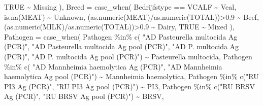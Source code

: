 \documentclass[
]{article}
\newenvironment{Shaded}{\begin{snugshade}}{\end{snugshade}}
\newcommand{\AttributeTok}[1]{\textcolor[rgb]{0.77,0.63,0.00}{#1}}
\newcommand{\ConstantTok}[1]{\textcolor[rgb]{0.00,0.00,0.00}{#1}}
\newcommand{\FloatTok}[1]{\textcolor[rgb]{0.00,0.00,0.81}{#1}}
\newcommand{\FunctionTok}[1]{\textcolor[rgb]{0.00,0.00,0.00}{#1}}
\newcommand{\NormalTok}[1]{#1}
\newcommand{\SpecialCharTok}[1]{\textcolor[rgb]{0.00,0.00,0.00}{#1}}
\newcommand{\StringTok}[1]{\textcolor[rgb]{0.31,0.60,0.02}{#1}}
\begin{document}
\begin{Shaded}
\begin{Highlighting}[]
      \ConstantTok{TRUE} \SpecialCharTok{\textasciitilde{}} \StringTok{\textquotesingle{}Missing\textquotesingle{}}
\NormalTok{    ),}
    \AttributeTok{Breed =} \FunctionTok{case\_when}\NormalTok{(}
\NormalTok{      Bedrijfstype }\SpecialCharTok{==} \StringTok{\textquotesingle{}VCALF\textquotesingle{}} \SpecialCharTok{\textasciitilde{}} \StringTok{\textquotesingle{}Veal\textquotesingle{}}\NormalTok{,}
      \FunctionTok{is.na}\NormalTok{(MEAT) }\SpecialCharTok{\textasciitilde{}} \StringTok{\textquotesingle{}Unknown\textquotesingle{}}\NormalTok{,}
\NormalTok{      (}\FunctionTok{as.numeric}\NormalTok{(MEAT)}\SpecialCharTok{/}\FunctionTok{as.numeric}\NormalTok{(TOTAL))}\SpecialCharTok{\textgreater{}}\FloatTok{0.9} \SpecialCharTok{\textasciitilde{}} \StringTok{\textquotesingle{}Beef\textquotesingle{}}\NormalTok{, }
\NormalTok{      (}\FunctionTok{as.numeric}\NormalTok{(MILK)}\SpecialCharTok{/}\FunctionTok{as.numeric}\NormalTok{(TOTAL))}\SpecialCharTok{\textgreater{}}\FloatTok{0.9} \SpecialCharTok{\textasciitilde{}} \StringTok{\textquotesingle{}Dairy\textquotesingle{}}\NormalTok{,}
      \ConstantTok{TRUE} \SpecialCharTok{\textasciitilde{}} \StringTok{\textquotesingle{}Mixed\textquotesingle{}} 
\NormalTok{    ),}
    \AttributeTok{Pathogen =} \FunctionTok{case\_when}\NormalTok{(}
\NormalTok{      Pathogen }\SpecialCharTok{\%in\%} \FunctionTok{c}\NormalTok{(}
        \StringTok{"AD Pasteurella multocida Ag (PCR)"}\NormalTok{, }
        \StringTok{"AD Pasteurella multocida Ag pool (PCR)"}\NormalTok{, }
        \StringTok{"AD P. multocida Ag (PCR)"}\NormalTok{, }
        \StringTok{"AD P. multocida Ag pool (PCR)"}\NormalTok{) }\SpecialCharTok{\textasciitilde{}} \StringTok{\textquotesingle{}Pasteurella multocida\textquotesingle{}}\NormalTok{,}
\NormalTok{      Pathogen }\SpecialCharTok{\%in\%} \FunctionTok{c}\NormalTok{(}
        \StringTok{"AD Mannheimia haemolytica Ag (PCR)"}\NormalTok{, }
        \StringTok{"AD Mannheimia haemolytica Ag pool (PCR)"}\NormalTok{) }\SpecialCharTok{\textasciitilde{}} \StringTok{\textquotesingle{}Mannheimia haemolytica\textquotesingle{}}\NormalTok{,}
\NormalTok{      Pathogen }\SpecialCharTok{\%in\%} \FunctionTok{c}\NormalTok{(}\StringTok{"RU PI3 Ag (PCR)"}\NormalTok{, }\StringTok{"RU PI3 Ag pool (PCR)"}\NormalTok{) }\SpecialCharTok{\textasciitilde{}} \StringTok{\textquotesingle{}PI3\textquotesingle{}}\NormalTok{,}
\NormalTok{      Pathogen }\SpecialCharTok{\%in\%} \FunctionTok{c}\NormalTok{(}\StringTok{"RU BRSV Ag (PCR)"}\NormalTok{, }\StringTok{"RU BRSV Ag pool (PCR)"}\NormalTok{) }\SpecialCharTok{\textasciitilde{}} \StringTok{\textquotesingle{}BRSV\textquotesingle{}}\NormalTok{,}

\end{Highlighting}
\end{Shaded}
\end{document}
